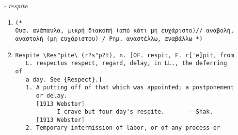 \documentclass{article}
\begin{document}
\begin{itemize}
\begin{enumerate}
{\begin{lstlisting}
   superl. {Nighest}, or {Next} (n[e^]kst).] [OE. nigh, neigh,
   neih, AS. ne['a]h, n[=e]h; akin to D. na, adv., OS. n[=a]h,
   a., OHG. n[=a]h, G. nah, a., nach to, after, Icel. n[=a] (in
   comp.) nigh, Goth. n[=e]hw, n[=e]hwa, adv., nigh. Cf. {Near},
   {Neighbor}, {Next}.]
   1. Not distant or remote in place or time; near.
      [1913 Webster]
            The loud tumult shows the battle nigh. --Prior.
      [1913 Webster]
   2. Not remote in degree, kindred, circumstances, etc.;
      closely allied; intimate. ``Nigh kinsmen.'' --Knolles.
      [1913 Webster]
            Ye . . . are made nigh by the blood of Christ.
                                                  --Eph. ii. 13.
      [1913 Webster]
   Syn: Near; close; adjacent; contiguous; present; neighboring.
        [1913 Webster]
Nigh \Nigh\, adv. [AS. ne['a]h, n[=e]h. See {Nigh}, a.]
   1. In a situation near in place or time, or in the course of
      events; near.
      [1913 Webster]
            He was sick, nigh unto death.         --Phil. ii.
                                                  27.
      [1913 Webster]
            He drew not nigh unheard; the angel bright,
            Ere he drew nigh, his radiant visage turned.
                                                  --Milton.
      [1913 Webster]
   2. Almost; nearly; as, he was nigh dead.
      [1913 Webster]
Nigh \Nigh\, v. t. & i.
   To draw nigh (to); to approach; to come near. [Obs.] --Wyclif
   (Matt. iii. 2).
   [1913 Webster]
Nigh \Nigh\, prep.
   Near to; not remote or distant from. ``was not this nigh
   shore?'' --Shak.
   [1913 Webster]
\end{lstlisting}}
\end{enumerate}
\item[$\square$] \emph{ respite }
\begin{enumerate}
\item{
\begin{lstlisting}
(* 
Ουσ. ανάπαυλα, μικρή διακοπή (από κάτι μη ευχάριστο)// αναβολή, αναστολή (μη ευχάριστου) / Ρημ. αναστέλλω, αναβάλλω *)
\end{lstlisting}}
\item{
\begin{lstlisting}
Respite \Res"pite\ (r?s"p?t), n. [OF. respit, F. r['e]pit, from
   L. respectus respect, regard, delay, in LL., the deferring of
   a day. See {Respect}.]
   1. A putting off of that which was appointed; a postponement
      or delay.
      [1913 Webster]
            I crave but four day's respite.       --Shak.
      [1913 Webster]
   2. Temporary intermission of labor, or of any process or

\end{lstlisting}}
\end{enumerate}
\end{itemize}
\end{document}
